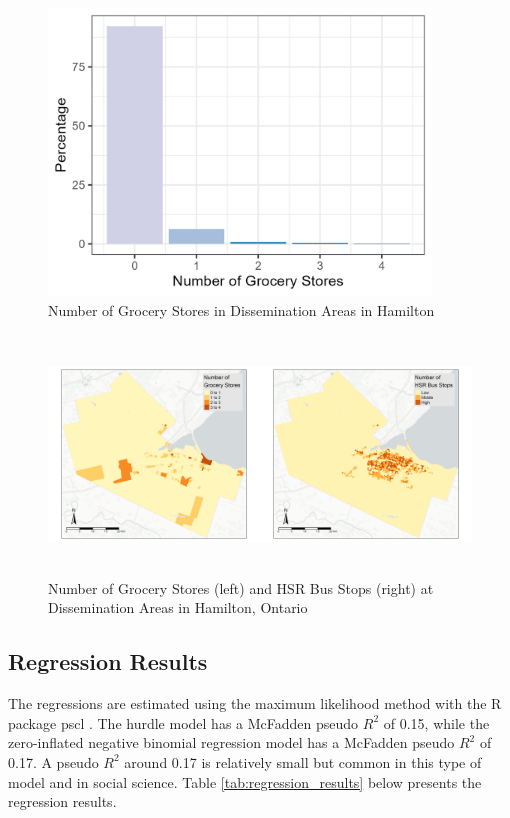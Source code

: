 \documentclass[preprint, 3p,
authoryear]{elsarticle} %
\begin{document}
\begin{figure}

{\centering \includegraphics[width=4in,height=3in]{./images/dep} 

}

\caption{\label{fig:dep}Number of Grocery Stores in Dissemination Areas in Hamilton}\label{fig:unnamed-chunk-10}
\end{figure}

\begin{figure}

{\centering \includegraphics[width=6in,height=2.5in]{./images/descriptive} 

}

\caption{\label{fig:descriptive}Number of Grocery Stores (left) and HSR Bus Stops (right) at Dissemination Areas in Hamilton, Ontario}\label{fig:unnamed-chunk-13}
\end{figure}

\subsection{Regression Results}\label{regression-results}

The regressions are estimated using the maximum likelihood method with
the R package pscl \citep{pscl}. The hurdle model has a McFadden pseudo
\(R^2\) of 0.15, while the zero-inflated negative binomial regression
model has a McFadden pseudo \(R^2\) of 0.17. A pseudo \(R^2\) around
0.17 is relatively small but common in this type of model and in social
science. Table \ref{tab:regression_results} below presents the
regression results.
\end{document}
